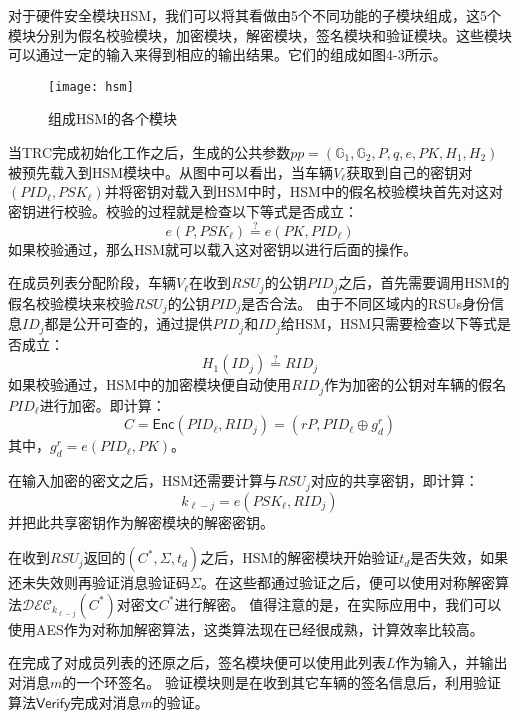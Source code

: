 对于硬件安全模块HSM，我们可以将其看做由5个不同功能的子模块组成，这5个模块分别为假名校验模块，加密模块，解密模块，签名模块和验证模块。这些模块可以通过一定的输入来得到相应的输出结果。它们的组成如图4-3所示。

\begin{figure}[h]
\centering
\texttt{[image: hsm]}
\caption{组成HSM的各个模块}
\end{figure}

当TRC完成初始化工作之后，生成的公共参数$pp=(\mathbb{G}_1,\mathbb{G}_2,P,q,e,PK,H_1,H_2)$被预先载入到HSM模块中。从图中可以看出，当车辆$V_\ell$获取到自己的密钥对$(PID_\ell,PSK_\ell)$并将密钥对载入到HSM中时，HSM中的假名校验模块首先对这对密钥进行校验。校验的过程就是检查以下等式是否成立：
\begin{equation}
e(P,PSK_\ell)\overset{?}{=}e(PK,PID_\ell)
\end{equation}
如果校验通过，那么HSM就可以载入这对密钥以进行后面的操作。

在成员列表分配阶段，车辆$V_\ell$在收到$RSU_j$的公钥$PID_j$之后，首先需要调用HSM的假名校验模块来校验$RSU_j$的公钥$PID_j$是否合法。
由于不同区域内的RSUs身份信息$ID_j$都是公开可查的，通过提供$PID_j$和$ID_j$给HSM，HSM只需要检查以下等式是否成立：
\begin{equation}
H_1(ID_j)\overset{?}{=}RID_j
\end{equation}
如果校验通过，HSM中的加密模块便自动使用$RID_j$作为加密的公钥对车辆的假名$PID_\ell$进行加密。即计算：
\begin{equation}
C=\mathsf{Enc}(PID_\ell,RID_j)=(rP,PID_\ell\oplus g_d^r)
\end{equation}
其中，$g_d^r=e(PID_\ell,PK)$。

在输入加密的密文之后，HSM还需要计算与$RSU_j$对应的共享密钥，即计算：
\begin{equation}
k_{\ell-j}=e(PSK_\ell,RID_j)
\end{equation}
并把此共享密钥作为解密模块的解密密钥。

在收到$RSU_j$返回的$(C^*,\Sigma,t_d)$之后，HSM的解密模块开始验证$t_d$是否失效，如果还未失效则再验证消息验证码$\Sigma$。在这些都通过验证之后，便可以使用对称解密算法$\mathcal{DEC}_{k_{\ell-j}}(C^*)$对密文$C^*$进行解密。
值得注意的是，在实际应用中，我们可以使用AES作为对称加解密算法，这类算法现在已经很成熟，计算效率比较高。

在完成了对成员列表的还原之后，签名模块便可以使用此列表$L$作为输入，并输出对消息$m$的一个环签名。
验证模块则是在收到其它车辆的签名信息后，利用验证算法$\mathsf{Verify}$完成对消息$m$的验证。

